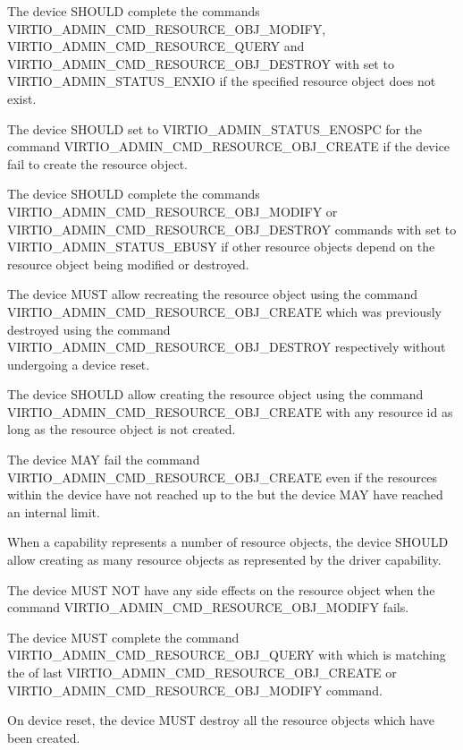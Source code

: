 The device SHOULD complete the commands VIRTIO_ADMIN_CMD_RESOURCE_OBJ_MODIFY,
VIRTIO_ADMIN_CMD_RESOURCE_QUERY and
VIRTIO_ADMIN_CMD_RESOURCE_OBJ_DESTROY with  set to
VIRTIO_ADMIN_STATUS_ENXIO if the specified resource object does not exist.

The device SHOULD set  to VIRTIO_ADMIN_STATUS_ENOSPC for the
command VIRTIO_ADMIN_CMD_RESOURCE_OBJ_CREATE if the device fail to create the
resource object.

The device SHOULD complete the commands VIRTIO_ADMIN_CMD_RESOURCE_OBJ_MODIFY or
VIRTIO_ADMIN_CMD_RESOURCE_OBJ_DESTROY commands with  set to
VIRTIO_ADMIN_STATUS_EBUSY if other resource objects depend on the resource object
being modified or destroyed.

The device MUST allow recreating the resource object using the command
VIRTIO_ADMIN_CMD_RESOURCE_OBJ_CREATE which was previously
destroyed using the command VIRTIO_ADMIN_CMD_RESOURCE_OBJ_DESTROY respectively
without undergoing a device reset.

The device SHOULD allow creating the resource object using
the command VIRTIO_ADMIN_CMD_RESOURCE_OBJ_CREATE with any resource
id as long as the resource object is not created.

The device MAY fail the command VIRTIO_ADMIN_CMD_RESOURCE_OBJ_CREATE even if the
resources within the device have not reached up to the 
but the device MAY have reached an internal limit.

When a capability represents a number of resource objects, the device SHOULD
allow creating as many resource objects as represented by the driver capability.

The device MUST NOT have any side effects on the resource object when the command
VIRTIO_ADMIN_CMD_RESOURCE_OBJ_MODIFY fails.

The device MUST complete the command VIRTIO_ADMIN_CMD_RESOURCE_OBJ_QUERY
with  which is matching the
 of last VIRTIO_ADMIN_CMD_RESOURCE_OBJ_CREATE
or VIRTIO_ADMIN_CMD_RESOURCE_OBJ_MODIFY command.

On device reset, the device MUST destroy all the resource objects which
have been created.


